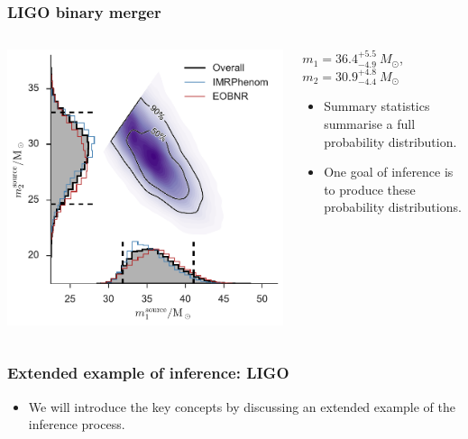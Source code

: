\documentclass[%
]{beamer}
\begin{document}
\begin{frame}
    \frametitle{LIGO binary merger}
    \begin{columns}
        \begin{column}{0.65\textwidth}
            \includegraphics[width=\textwidth]{./figures/ligo_m1_m2.pdf}
        \end{column}
        \begin{column}{0.35\textwidth}
            ${m_1 = 36.4^{+5.5}_{-4.9}\:M_\odot}$, ${m_2 = 30.9^{+4.8}_{-4.4}\:M_\odot}$
            \begin{itemize}
                \pause\item Summary statistics summarise a full probability distribution.
                \pause\item One goal of inference is to produce these probability distributions.
            \end{itemize}
        \end{column}
    \end{columns}
\end{frame}

\begin{frame}
    \frametitle{Extended example of inference: LIGO}
    \begin{itemize}
        \item We will introduce the key concepts by discussing an extended example of the inference process.
    \end{itemize}
\end{frame}
\end{document}
